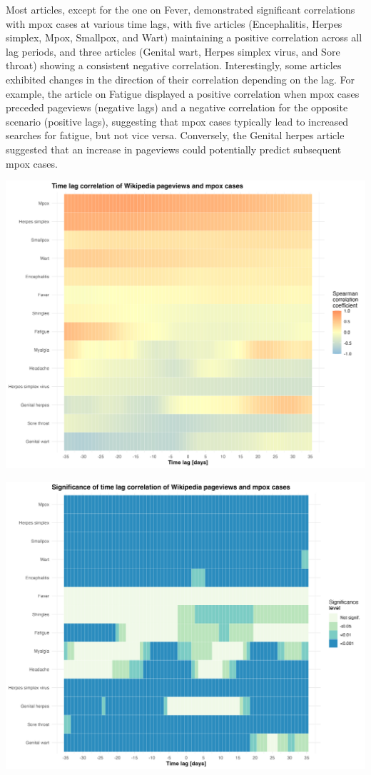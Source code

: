 \documentclass[
  12pt,
]{article}
\begin{document}
Most articles, except for the one on Fever, demonstrated significant
correlations with mpox cases at various time lags, with five articles
(Encephalitis, Herpes simplex, Mpox, Smallpox, and Wart) maintaining a
positive correlation across all lag periods, and three articles (Genital
wart, Herpes simplex virus, and Sore throat) showing a consistent
negative correlation. Interestingly, some articles exhibited changes in
the direction of their correlation depending on the lag. For example,
the article on Fatigue displayed a positive correlation when mpox cases
preceded pageviews (negative lags) and a negative correlation for the
opposite scenario (positive lags), suggesting that mpox cases typically
lead to increased searches for fatigue, but not vice versa. Conversely,
the Genital herpes article suggested that an increase in pageviews could
potentially predict subsequent mpox cases.~

\begin{center}
\includegraphics{images/spearman-correlation-heatmap.png}
\end{center}

\begin{center}
\includegraphics{images/spearman-pvalues-heatmap.png}
\end{center}
\end{document}
